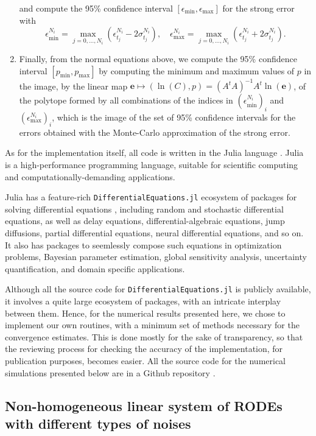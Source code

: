 \documentclass[reqno,12pt]{amsart}
\theoremstyle{plain} %
\theoremstyle{definition} %
\begin{document}
\begin{enumerate}
\[    \]
    and compute the 95\% confidence interval $[\epsilon_{\min}, \epsilon_{\max}]$ for the strong error with
    \[
        \epsilon_{\min}^{N_i} = \max_{j=0, \ldots, N_i} (\epsilon_{t_j}^{N_i} - 2\sigma_{t_j}^{N_i}), \quad \epsilon_{\max}^{N_i} = \max_{j=0, \ldots, N_i} (\epsilon_{t_j}^{N_i} + 2\sigma_{t_j}^{N_i}).
    \]
    \item Finally, from the normal equations above, we compute the 95\% confidence interval $[p_{\min}, p_{\max}]$ by computing the minimum and maximum values of $p$ in the image, by the linear map $\mathbf{e} \mapsto (\ln(C), p) = (A^tA)^{-1}A^t\ln(\mathbf{e})$, of the polytope formed by all combinations of the indices in $(\epsilon_{\min}^{N_i})_i$ and $(\epsilon_{\max}^{N_i})_i$, which is the image of the set of 95\% confidence intervals for the errors obtained with the Monte-Carlo approximation of the strong error.
\end{enumerate}

As for the implementation itself, all code is written in the Julia language \cite{Julia2017}. Julia is a high-performance programming language, suitable for scientific computing and computationally-demanding applications.

Julia has a feature-rich \texttt{DifferentialEquations.jl} ecosystem of packages for solving differential equations \cite{RackauckasNie2017}, including random and stochastic differential equations, as well as delay equations, differential-algebraic equations, jump diffusions, partial differential equations, neural differential equations, and so on. It also has packages to seemlessly compose such equations in optimization problems, Bayesian parameter estimation, global sensitivity analysis, uncertainty quantification, and domain specific applications.

Although all the source code for \texttt{DifferentialEquations.jl} is publicly available, it involves a quite large ecosystem of packages, with an intricate interplay between them. Hence, for the numerical results presented here, we chose to implement our own routines, with a minimum set of methods necessary for the convergence estimates. This is done mostly for the sake of transparency, so that the reviewing process for checking the accuracy of the implementation, for publication purposes, becomes easier. All the source code for the numerical simulations presented below are in a Github repository \cite{RODEConvEM2023}.

\subsection{Non-homogeneous linear system of RODEs with different types of noises}
\end{document}
